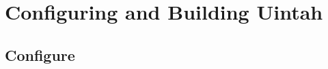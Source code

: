 \documentclass[12pt]{article}
\begin{document}

\section{Configuring and Building Uintah}

\subsection{Configure}
\end{document}
